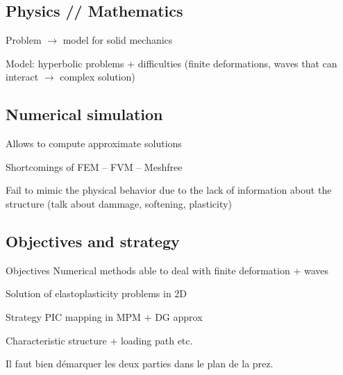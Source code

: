 
\subsection*{Physics // Mathematics}
\begin{frame}
  Problem $\rightarrow$ model for solid mechanics

      
  Model: hyperbolic problems + difficulties (finite deformations, waves that can interact $\rightarrow$ complex solution)
\end{frame}
\subsection*{Numerical simulation}
\begin{frame}
  Allows to compute approximate solutions

  Shortcomings of FEM -- FVM -- Meshfree

  Fail to mimic the physical behavior due to the lack of information about the structure (talk about dammage, softening, plasticity)
\end{frame}

\subsection*{Objectives and strategy}
\begin{frame}{Objectives}
  Numerical methods able to deal with finite deformation + waves

  Solution of elastoplasticity problems in 2D
\end{frame}

\begin{frame}{Strategy}
  PIC mapping in MPM + DG approx

  Characteristic structure + loading path etc.

  Il faut bien démarquer les deux parties dans le plan de la prez.
\end{frame}


